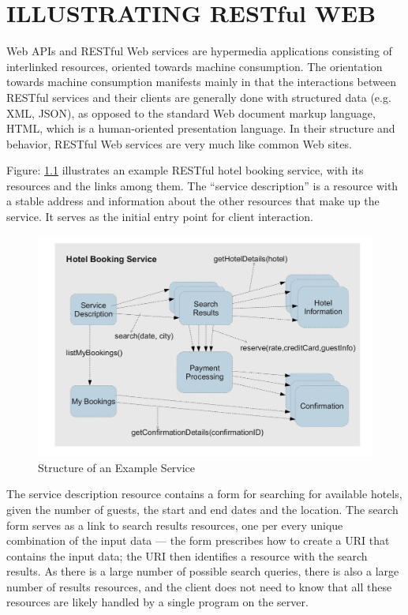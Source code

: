 \chapter{ILLUSTRATING RESTful WEB}
\begin{spacing}{1.5}
Web APIs and RESTful Web services are hypermedia applications consisting of interlinked resources, oriented towards machine consumption. The orientation towards machine consumption manifests mainly in that the interactions between RESTful services and their clients are generally done with structured data (e.g. XML, JSON), as opposed to the standard Web document markup language, HTML, which is a human-oriented presentation language. In their structure and behavior, RESTful Web services are very much like common Web sites. 

Figure: \ref{fig:hotel_booking} illustrates an example RESTful hotel booking service, with its resources and the links among them. The “service description” is a resource with a stable address and information about the other resources that make up the service. It serves as the initial entry point for client interaction. 

\begin{figure}
        \centering
        \includegraphics[scale=0.4]{images/hotel_booking.jpg}
        \caption{Structure of an Example Service}
        \label{fig:hotel_booking}
\end{figure}
The service description resource contains a form for searching for available hotels, given the number of guests, the start and end dates and the location. The search form serves as a link to search results resources, one per every unique combination of the input data — the form prescribes how to create a URI that contains the input data; the URI then identifies a resource with the search results. As there is a large number of possible search queries, there is also a large number of results resources, and the client does not need to know that all these resources are likely handled by a single program on the server. 


\end{spacing}
